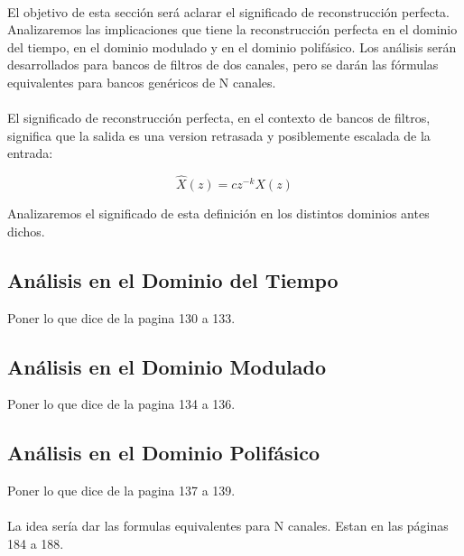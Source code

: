 \paragraph{}
El objetivo de esta sección será aclarar el significado de reconstrucción perfecta. Analizaremos las implicaciones que tiene la reconstrucción perfecta en el dominio del tiempo, en el dominio modulado y en el dominio polifásico. Los análisis serán desarrollados para bancos de filtros de dos canales, pero se darán las fórmulas equivalentes para bancos genéricos de N canales.
\paragraph{}
El significado de reconstrucción perfecta, en el contexto de bancos de filtros, significa que la salida es una version retrasada y posiblemente escalada de la entrada:

\begin{equation}
	\hat{X}(z) = c z^{-k} X(z)
\end{equation}

Analizaremos el significado de esta definición en los distintos dominios antes dichos.

\subsection{Análisis en el Dominio del Tiempo}

Poner lo que dice de la pagina 130 a 133.

\subsection{Análisis en el Dominio Modulado}

Poner lo que dice de la pagina 134 a 136.

\subsection{Análisis en el Dominio Polifásico}

Poner lo que dice de la pagina 137 a 139.

\paragraph{}
La idea sería dar las formulas equivalentes para N canales. Estan en las páginas 184 a 188.
